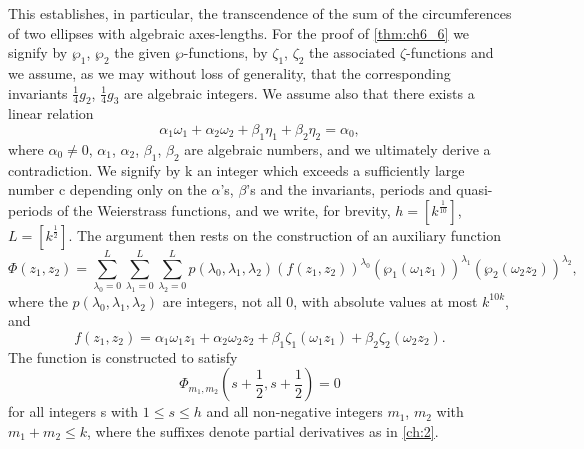 This establishes, in particular, the transcendence of the sum of the circumferences of two ellipses with algebraic axes-lengths. For the proof of \autoref{thm:ch6_6} we signify by $\wp_1$, $\wp_2$ the given $\wp$-functions, by $\zeta_1$, $\zeta_2$ the associated $\zeta$-functions and we assume, as we may without loss of generality, that the corresponding invariants $\frac{1}{4}g_2$, $\frac{1}{4}g_3$ are algebraic integers. We assume also that there exists a linear relation
\[\alpha_1\omega_1 + \alpha_2\omega_2 + \beta_1\eta_1 + \beta_2\eta_2 = \alpha_0,\]
where $\alpha_0 \neq 0$, $\alpha_1$, $\alpha_2$, $\beta_1$, $\beta_2$ are algebraic numbers, and we ultimately derive a contradiction. We signify by k an integer which exceeds a sufficiently large number c depending only on the $\alpha$'s, $\beta$'s and the invariants, periods and quasi-periods of the Weierstrass functions, and we write, for brevity, $h = [k^{\frac{1}{10}}]$, $L = [k^{\frac{1}{2}}]$. The argument then rests on the construction of an auxiliary function
\[\Phi(z_1,z_2) = \sum_{\lambda_0=0}^L \sum_{\lambda_1=0}^L \sum_{\lambda_2=0}^L p(\lambda_0,\lambda_1,\lambda_2) \left( f(z_1,z_2) \right)^{\lambda_0} (\wp_1(\omega_1 z_1))^{\lambda_1} (\wp_2(\omega_2 z_2))^{\lambda_2},\]
where the $p(\lambda_0, \lambda_1, \lambda_2)$ are integers, not all 0, with absolute values at most $k^{10k}$, and
\[f(z_1, z_2) = \alpha_1 \omega_1 z_1 + \alpha_2 \omega_2 z_2 + \beta_1 \zeta_1(\omega_1 z_1) + \beta_2 \zeta_2(\omega_2 z_2).\]
The function is constructed to satisfy
\[\Phi_{m_1, m_2}(s+\frac{1}{2}, s+\frac{1}{2}) = 0\]
for all integers s with $1 \le s \le h$ and all non-negative integers $m_1$, $m_2$ with $m_1 + m_2 \le k$, where the suffixes denote partial derivatives as in \autoref{ch:2}.

